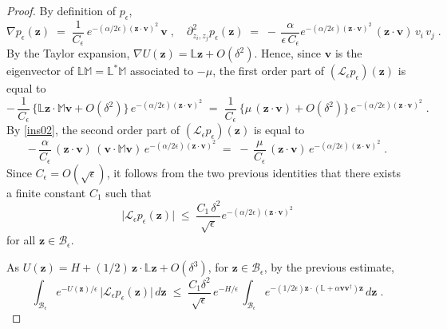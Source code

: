 \documentclass[reqno]{amsart}
\newcounter{as}[section]
\newcommand{\mc}[1]{{\mathcal #1}}
\newcommand{\bb}[1]{{\mathbb #1}}
\newcommand{\bs}[1]{{\boldsymbol #1}}
\newcommand{\<}{\langle}
\renewcommand{\>}{\rangle}
\begin{document}
\begin{proof}
By definition of $p_{\epsilon}$,
\begin{equation*}
\nabla p_{\epsilon}(\bs{z})\;=\;\frac{1}{C_{\epsilon}}\,
e^{-(\alpha/2\epsilon) (\bs{z}\cdot\bs{v})^{2}}\, \bs{v}\;, \quad
\partial^2_{z_i,z_j} p_{\epsilon} (\bs{z})\;=\;-\,
\frac{\alpha}{\epsilon\, C_{\epsilon}}e^{- (\alpha/2\epsilon) (\bs{z}\cdot\bs{v})^{2}}
\, (\bs{z}\cdot\bs{v})\, v_{i}\, v_{j}\;.
\end{equation*}
By the Taylor expansion, $\nabla
U(\bs{z})=\bb{L}\bs{z}+O(\delta^{2})$. Hence, since $\bs v$ is the
eigenvector of $\bb L \bb M = \bb L^* \bb M$ associated to $-\mu$, the
first order part of $(\mc{L}_{\epsilon} p_{\epsilon}) (\bs{z})$ is
equal to
\begin{equation*}
-\, \frac{1}{C_{\epsilon}}\, \Big\{ \bb L \bs z  \cdot \bb M \bs v +
O(\delta^{2}) \Big\} \, e^{- (\alpha/2\epsilon)
  (\bs{z}\cdot\bs{v})^{2}}
\;=\; \frac{1}{C_{\epsilon}}\, \Big\{ \mu \, (\bs z \cdot \bs v) +
O(\delta^{2}) \Big\} \, e^{- (\alpha/2\epsilon)
  (\bs{z}\cdot\bs{v})^{2}}\;.
\end{equation*}
By \eqref{ins02}, the second order part of $(\mc{L}_{\epsilon}
p_{\epsilon}) (\bs{z})$ is equal to
\begin{equation*}
-\, \frac{\alpha}{C_{\epsilon}}\,  (\bs z \cdot \bs v) \,
(\bs v  \cdot \bb M \bs v) \,
e^{- (\alpha/2\epsilon)  (\bs{z}\cdot\bs{v})^{2}} \;=\;
-\, \frac{\mu}{C_{\epsilon}}\,  (\bs z \cdot \bs v) \,
e^{- (\alpha/2\epsilon)  (\bs{z}\cdot\bs{v})^{2}}\;.
\end{equation*}
Since $C_{\epsilon}=O(\sqrt{\epsilon})$, it follows from the two
previous identities that there exists a finite constant $C_1$ such
that
\begin{equation*}
\big|\mc{L}_{\epsilon} p_{\epsilon}(\bs{z})\big|
\;\le\;\frac{C_1\, \delta^{2}}{\sqrt{\epsilon}}
e^{- (\alpha/2\epsilon) (\bs{z}\cdot\bs{v})^{2}}
\end{equation*}
for all $\bs z\in \mc{B}_{\epsilon}$.

As $U(\bs{z})=H+ (1/2)\, \bs{z}\cdot\bb{L}\bs{z}+O(\delta^{3})$, for
$\bs{z}\in\mc{B}_{\epsilon}$, by the previous estimate,
\begin{equation}
\label{se52}
\int_{\mc{B}_{\epsilon}}e^{- U(\bs{z})/\epsilon}\,
\big|\mc{L}_{\epsilon}p_{\epsilon}(\bs{z})\big|\, d\bs{z}
\;\le\;\frac{C_1 \delta^{2}}{\sqrt{\epsilon}}\, e^{-H/\epsilon}
\, \int_{\mc{B}_{\epsilon}}
e^{-(1/2\epsilon) \bs{z}\cdot
  (\bb{L}+\alpha\bs{v}\bs{v}^{\dagger})\bs{z}} \, d\bs{z} \;.
\end{equation}


\end{proof}
\end{document}
